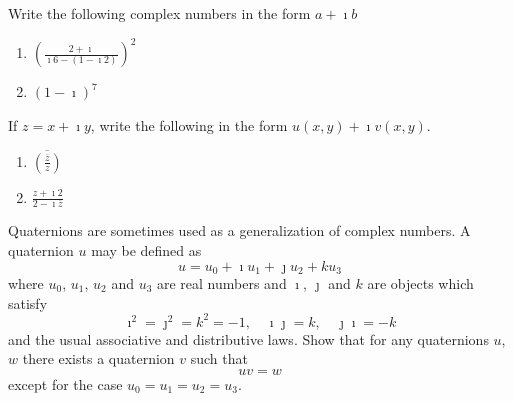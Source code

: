 {\begin{Exercise}
\end{Exercise}





\begin{Exercise}
  \label{exercise (1 - i)7}
  Write the following complex numbers in the form $a + \imath b$
  \begin{enumerate}
  \item
    $\displaystyle
    \left( \frac{2 + \imath}{\imath 6 - (1 - \imath 2)} \right)^2
    $
  \item
    $\displaystyle
    (1 - \imath)^7
    $
  \end{enumerate}

\end{Exercise}








\begin{Exercise}
  \label{exercise ov ov z z}
  If $z = x + \imath y$, write the following in the form $u(x,y) + \imath v(x,y)$.
  \begin{enumerate}
  \item
    $\displaystyle 
    \overline{ \left( \frac{ \overline{z} }{ z } \right) }
    $
  \item
    $\displaystyle 
    \frac{ z + \imath 2 }{ 2 - \imath \overline{z} }
    $
  \end{enumerate}

\end{Exercise}







\begin{Exercise}
  \label{exercise quaternion}
  Quaternions are sometimes used as a generalization of complex numbers.
  A quaternion $u$ may be defined as
  \[
  u = u_0 + \imath u_1 + \jmath u_2 + k u_3
  \]
  where $u_0$, $u_1$, $u_2$ and $u_3$ are real numbers and $\imath$, $\jmath$ and $k$
  are objects which satisfy
  \[
  \imath^2 = \jmath^2 = k^2 = -1, \quad
  \imath \jmath = k, \quad
  \jmath \imath = - k
  \]
  and the usual associative and distributive laws.  Show that for any
  quaternions $u$, $w$ there exists a quaternion $v$ such that
  \[
  u v = w
  \]
  except for the case $u_0 = u_1 = u_2 = u_3$.


\end{Exercise}}

